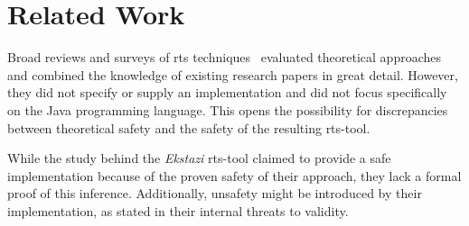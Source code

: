 \section{Related Work}
Broad reviews and surveys of \ac{rts} techniques~\cite{rts_techniques,rts_techniques2} 
evaluated theoretical approaches and
combined the knowledge of existing research papers in great detail. 
However, they did not specify or supply an implementation
and did not focus specifically on the Java programming language. This opens the possibility for discrepancies 
between theoretical safety and the safety of the resulting \ac{rts}-tool.

\par

%
% 



While the study behind the \emph{Ekstazi} \ac{rts}-tool claimed to provide a safe implementation because
of the proven safety of their approach, they lack a formal proof of this
inference. Additionally, unsafety might be introduced by their implementation, as
stated in their internal threats to validity.~\cite{ekstazispec}

% 

